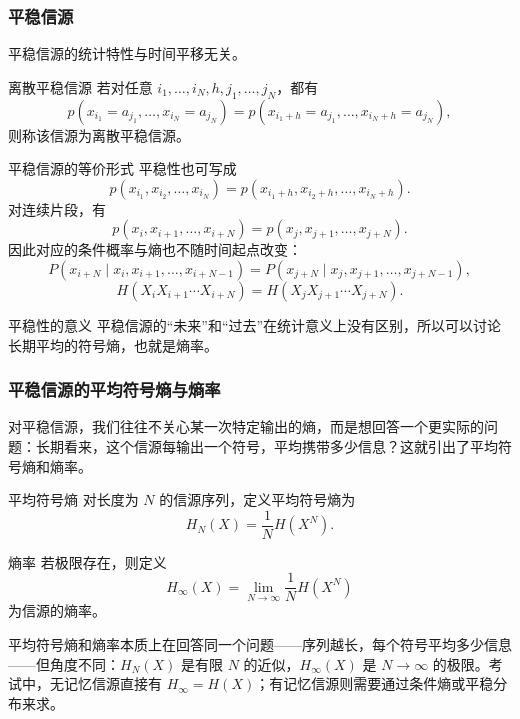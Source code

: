 \subsubsection{平稳信源}
平稳信源的统计特性与时间平移无关。

\begin{definitionBox}{离散平稳信源}
若对任意 $i_1,\dots,i_N,h,j_1,\dots,j_N$，都有
\[
 p(x_{i_1}=a_{j_1},\dots,x_{i_N}=a_{j_N})
 =
 p(x_{i_1+h}=a_{j_1},\dots,x_{i_N+h}=a_{j_N}),
\]
则称该信源为离散平稳信源。
\end{definitionBox}

\begin{formulaBox}{平稳信源的等价形式}
平稳性也可写成
\[
 p(x_{i_1},x_{i_2},\dots,x_{i_N})
 =
 p(x_{i_1+h},x_{i_2+h},\dots,x_{i_N+h}).
\]
对连续片段，有
\[
 p(x_i,x_{i+1},\dots,x_{i+N})
 =
 p(x_j,x_{j+1},\dots,x_{j+N}).
\]
因此对应的条件概率与熵也不随时间起点改变：
\[
 P(x_{i+N}\mid x_i,x_{i+1},\dots,x_{i+N-1})
 =
 P(x_{j+N}\mid x_j,x_{j+1},\dots,x_{j+N-1}),
\]
\[
 H(X_iX_{i+1}\cdots X_{i+N})
 =
 H(X_jX_{j+1}\cdots X_{j+N}).
\]
\end{formulaBox}

\begin{keypoint}{平稳性的意义}
平稳信源的“未来”和“过去”在统计意义上没有区别，所以可以讨论长期平均的符号熵，也就是熵率。
\end{keypoint}

\subsubsection{平稳信源的平均符号熵与熵率}
对平稳信源，我们往往不关心某一次特定输出的熵，而是想回答一个更实际的问题：长期看来，这个信源每输出一个符号，平均携带多少信息？这就引出了平均符号熵和熵率。

\begin{definitionBox}{平均符号熵}
对长度为 $N$ 的信源序列，定义平均符号熵为
\[
 H_N(X)=\frac{1}{N}H(X^N).
\]
\end{definitionBox}

\begin{definitionBox}{熵率}
若极限存在，则定义
\[
 H_\infty(X)=\lim_{N\to\infty}\frac{1}{N}H(X^N)
\]
为信源的熵率。
\end{definitionBox}

平均符号熵和熵率本质上在回答同一个问题——序列越长，每个符号平均多少信息——但角度不同：$H_N(X)$ 是有限 $N$ 的近似，$H_\infty(X)$ 是 $N\to\infty$ 的极限。考试中，无记忆信源直接有 $H_\infty=H(X)$；有记忆信源则需要通过条件熵或平稳分布来求。

